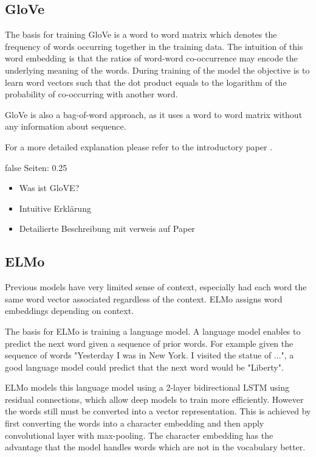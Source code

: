 \documentclass[draft,final,oneside]{vutinfth} %
\begin{document}
\fi

\subsection{GloVe \cite{glovepage}}
The basis for training GloVe is a word to word matrix which denotes the frequency of words occurring together in the training data. The intuition of this word embedding is that the ratios of word-word co-occurrence may encode the underlying meaning of the words. During training of the model the objective is to learn word vectors such that the dot product equals to the logarithm of the probability of co-occurring with another word.

GloVe is also a bag-of-word approach, as it uses a word to word matrix without any information about sequence.

For a more detailed explanation please refer to the introductory paper \cite{glovepage}.

\if false
Seiten: 0.25

\begin{itemize}
\item Was ist GloVE?
\item Intuitive Erklärung
\item Detailierte Beschreibung mit verweis auf Paper
\end{itemize}

\fi

\subsection{ELMo \cite{elmo}}
Previous models have very limited sense of context, especially had each word the same word vector associated regardless of the context. ELMo assigns word embeddings depending on context.

The basis for ELMo is training a language model. A language model enables to predict the next word given a sequence of prior words. For example given the sequence of words "Yesterday I was in New York. I visited the statue of ...", a good language model could predict that the next word would be "Liberty".

ELMo models this language model using a 2-layer bidirectional LSTM using residual connections, which allow deep models to train more efficiently. However the words still must be converted into a vector representation. This is achieved by first converting the words into a character embedding and then apply convolutional layer with max-pooling. The character embedding has the advantage that the model handles words which are not in the vocabulary better.
\end{document}
